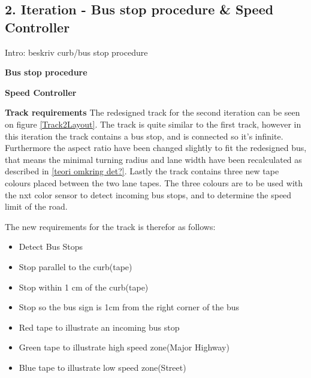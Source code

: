




\subsection{2. Iteration - Bus stop procedure \& Speed Controller}
Intro: beskriv curb/bus stop procedure


\textbf{Bus stop procedure} \newline

\textbf{Speed Controller} \newline


\textbf{Track requirements} \newline
The redesigned track for the second iteration can be seen on figure \ref{Track2Layout}. The track is quite similar to the first track, however in this iteration the track contains a bus stop, and is connected so it's infinite. Furthermore the aspect ratio have been changed slightly to fit the redesigned bus, that means the minimal turning radius and lane width have been recalculated as described in \ref{teori omkring det?}. Lastly the track contains three new tape colours placed between the two lane tapes. The three colours are to be used with the nxt color sensor to detect incoming bus stops, and to determine the speed limit of the road.

The new requirements for the track is therefor as follows:
\begin{itemize}
  \item Detect Bus Stops
  \item Stop parallel to the curb(tape)
  \item Stop within 1 cm of the curb(tape)
  \item Stop so the bus sign is 1cm from the right corner of the bus
  \item Red tape to illustrate an incoming bus stop
  \item Green tape to illustrate high speed zone(Major Highway)
  \item Blue tape to illustrate low speed zone(Street)
\end{itemize}

